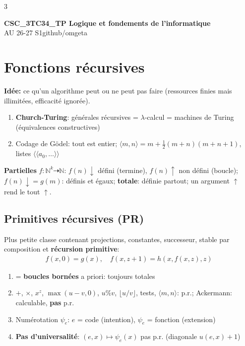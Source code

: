 \documentclass[12pt, a4paper]{article}
\newcommand{\mytitle}{CSC\_3TC34\_TP Logique et fondements de l'informatique}
\newcommand{\myauthor}{github/omgeta}
\newcommand{\mydate}{AU 26-27 S1}
\newcommand{\cN}{\mathbb{N}}
\newcommand{\dv}{{\downarrow}}
\newcommand{\uv}{{\uparrow}}
\newcommand{\code}[1]{\langle\!\langle #1\rangle\!\rangle}
\newcommand{\tto}{\dashrightarrow}
\begin{document}
\raggedright
\raggedcolumns
\footnotesize
\begin{multicols*}{3}
	\setlength{\premulticols}{1pt}
	\setlength{\postmulticols}{1pt}
	\setlength{\multicolsep}{1pt}
	\setlength{\columnsep}{2pt}

	{\normalsize{\textbf{\mytitle}}}\\
	{\footnotesize{\mydate\hspace{2pt}\textemdash\hspace{2pt}\myauthor}}

	\section{Fonctions récursives}
	\textbf{Idée:} ce qu'un algorithme peut ou ne peut pas faire (ressources finies mais illimitées, efficacité ignorée).
	\begin{enumerate}[\roman*.]
		\item \textbf{Church-Turing}: générales récursives = $\lambda$-calcul = machines de Turing (équivalences constructives)
		\item Codage de Gödel: tout est entier; $\langle m,n\rangle=m+\frac12(m+n)(m+n+1)$, listes $\code{a_0,\dots}$
	\end{enumerate}
	\textbf{Partielles} $f:\cN^k\tto\cN$: $f(n)\dv$ défini (termine), $f(n)\uv$ non défini (boucle); $f(n)\dv=g(m)$: définis et égaux; \textbf{totale}: définie partout; un argument $\uv$ rend le tout $\uv$.

	\subsection{Primitives récursives (PR)}
	Plus petite classe contenant projections, constantes, successeur, stable par composition et \textbf{récursion primitive}:
	\begin{gather*}
		f(x,0)=g(x),\quad f(x,z+1)=h(x,f(x,z),z)
	\end{gather*}
	\begin{enumerate}[\roman*.]
		\item = \textbf{boucles bornées} a priori: toujours totales
		\item $+$, $\times$, $x^z$, $\max(u-v,0)$, $u\%v$, $\lfloor u/v\rfloor$, tests, $\langle m,n\rangle$: p.r.; Ackermann: calculable, \textbf{pas} p.r.
		\item Numérotation $\psi_e$: $e$ = code (intention), $\psi_e$ = fonction (extension)
		\item \textbf{Pas d'universalité}: $(e,x)\mapsto\psi_e(x)$ pas p.r. (diagonale $u(e,x)+1$)
	\end{enumerate}


\end{multicols*}
\end{document}
